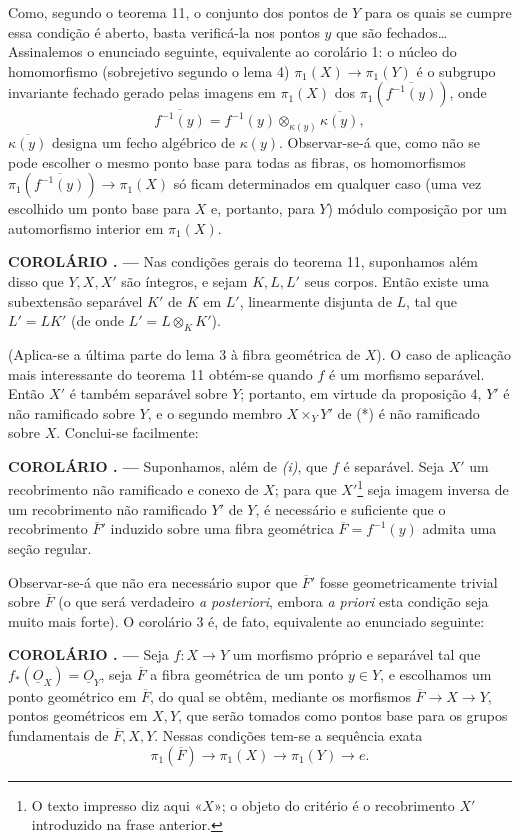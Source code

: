 \documentclass[11pt,twoside,openany]{book}
\numberwithin{equation}{section}
\newcommand{\src}[1]{%
  \phantomsection\hypertarget{src:#1}{}%
  \marginpar{\raggedleft\footnotesize\sffamily #1}%
}
\newcommand{\Osh}{\underline{O}}
\theoremstyle{plain}
\theoremstyle{definition}
\theoremstyle{remark}
\newcommand{\result}[2]{%
  \par\medskip\noindent\textbf{#1%
  \if\relax\detokenize{#2}\relax\else\space#2\fi. ---}\enspace
}
\newcommand{\FgaUnitKey}{frontmatter}
\renewcommand{\src}[1]{%
  \phantomsection\hypertarget{src:\FgaUnitKey:#1}{}%
  \marginpar{\raggedleft\footnotesize\sffamily #1}%
}
\begin{document}
Como, segundo o teorema 11, o conjunto dos pontos de $Y$ para os quais se
cumpre essa condição é aberto, basta verificá-la nos pontos $y$ que são
fechados\ldots{} Assinalemos o enunciado seguinte, equivalente ao corolário 1:
o núcleo do homomorfismo (sobrejetivo segundo o lema 4)
$\pi_1(X)\longrightarrow\pi_1(Y)$ é o subgrupo invariante fechado gerado
pelas imagens em $\pi_1(X)$ dos $\pi_1(\overline{f^{-1}(y)})$, onde
\[
  \overline{f^{-1}(y)}
  =f^{-1}(y)\otimes_{\kappa(y)}\overline{\kappa(y)},
\]
$\overline{\kappa(y)}$ designa um fecho algébrico de $\kappa(y)$. Observar-se-á
que, como não se pode escolher o mesmo ponto base para todas as fibras,
os homomorfismos $\pi_1(\overline{f^{-1}(y)})\longrightarrow\pi_1(X)$ só
ficam determinados em qualquer caso (uma vez escolhido um ponto base para $X$
e, portanto, para $Y$) módulo composição por um automorfismo interior em
$\pi_1(X)$.

\result{COROLÁRIO}{2} Nas condições gerais do teorema 11, suponhamos
além disso que $Y,X,X'$ são íntegros, e sejam $K,L,L'$ seus corpos. Então existe
uma subextensão separável $K'$ de $K$ em $L'$, linearmente disjunta de $L$, tal
que $L'=LK'$ (de onde $L'=L\otimes_K K'$).

(Aplica-se a última parte do lema 3 à fibra geométrica de $X$). O caso de
aplicação mais interessante do teorema 11 obtém-se quando $f$ é um morfismo
separável. Então $X'$ é também separável sobre $Y$; portanto, em virtude
da proposição 4, $Y'$ é não ramificado sobre $Y$, e o segundo membro
$X\times_Y Y'$ de (*) é não ramificado sobre $X$. Conclui-se facilmente:

\result{COROLÁRIO}{3} Suponhamos, além de \textit{(i)}, que $f$ é separável.
Seja $X'$ um recobrimento não ramificado e conexo de $X$; para que
$X'$\footnote{O texto impresso diz aqui «$X$»; o objeto do critério é o
recobrimento $X'$ introduzido na frase anterior.} seja imagem inversa de um
recobrimento não ramificado $Y'$ de $Y$, é necessário e suficiente que o
recobrimento $\overline F'$ induzido sobre uma fibra geométrica
$\overline F=f^{-1}(y)$ admita uma seção regular.

Observar-se-á que não era necessário supor que $\overline F'$ fosse
geometricamente trivial sobre $\overline F$ (o que será verdadeiro \textit{a
posteriori}, embora \textit{a priori} esta condição seja muito mais forte). O
corolário 3 é, de fato, equivalente ao enunciado seguinte:

\src{215}
\result{COROLÁRIO}{4} Seja $f:X\longrightarrow Y$ um morfismo próprio e separável
tal que $f_*(\Osh_X)=\Osh_Y$, seja $\overline F$ a fibra geométrica de um ponto
$y\in Y$, e escolhamos um ponto geométrico em $\overline F$, do qual se obtêm,
mediante os morfismos $\overline F\longrightarrow X\longrightarrow Y$, pontos
geométricos em $X,Y$, que serão tomados como pontos base para os grupos
fundamentais de $\overline F,X,Y$. Nessas condições tem-se a sequência
exata
\[
  \boxed{
    \pi_1(\overline F)\longrightarrow\pi_1(X)
    \longrightarrow\pi_1(Y)\longrightarrow e
  }.
\]
\end{document}
